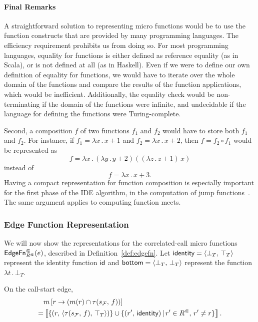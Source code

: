 \begin{mdelete}
\paragraph{Final Remarks}

A straightforward solution to representing micro functions would be to use the function constructs that are provided by many programming languages. The efficiency requirement prohibits us from doing so.
For most programming languages, equality for functions is either defined as reference equality (as in Scala), or is not defined at all (as in Haskell). Even if we were to define our own definition of equality for functions, we would have to iterate over the whole domain of the functions and compare the results of the function applications, which would be inefficient. Additionally, the equality check would be non-terminating if the domain of the functions were infinite, and undecidable if the language for defining the functions were Turing-complete.

Second, a composition $f$ of two functions $f_1$ and $f_2$ would have to store both $f_1$ and $f_2$. For instance, if $f_1=\lambda x\,.\,x+1$ and $f_2=\lambda x\,.\,x+2$, then $f=f_2\circ f_1$ would be represented as 
\[
  f=\lambda x\,.\,(\lambda y\,.\,y+2)((\lambda z\,.\,z+1)\,x)
\]
instead of
\[
  f=\lambda x\,.\,x+3.
\]
Having a compact representation for function composition is especially important for the first phase of the IDE algorithm, in the computation of jump functions~\cite{sagiv1996precise}. The same argument applies to computing function meets.
\end{mdelete}

\subsubsection{Edge Function Representation}  \label{sec:edgefnrep}
We will now show the representations for the correlated-call micro functions $\textsf{EdgeFn}^\Subset_{{R^\Subset}}(e)$, described in Definition~\ref{def:edgefn}. Let $\textsf{identity}=\left\langle \bot_T,\,\top_T\right\rangle$ represent the identity function $\textsf{id}$ and $\textsf{bottom}=\left\langle \bot_T,\,\bot_T\right\rangle$ represent the function $\lambda t\,.\,\bot_T$.

On the call-start edge,
\begin{align}
  &m\left[r\to (m(r)\cap\tau(s_\mathcal F,\,f))\right]\notag\\
  =&\left\llbracket\{(r,\,\langle\tau(s_\mathcal F,\,f),\,\top_T\rangle)\}
    \cup
    \{(r',\,\textsf{identity})\,|\,r'\in {R^\Subset},\,r'\ne r\}\right\rrbracket.
\end{align}

